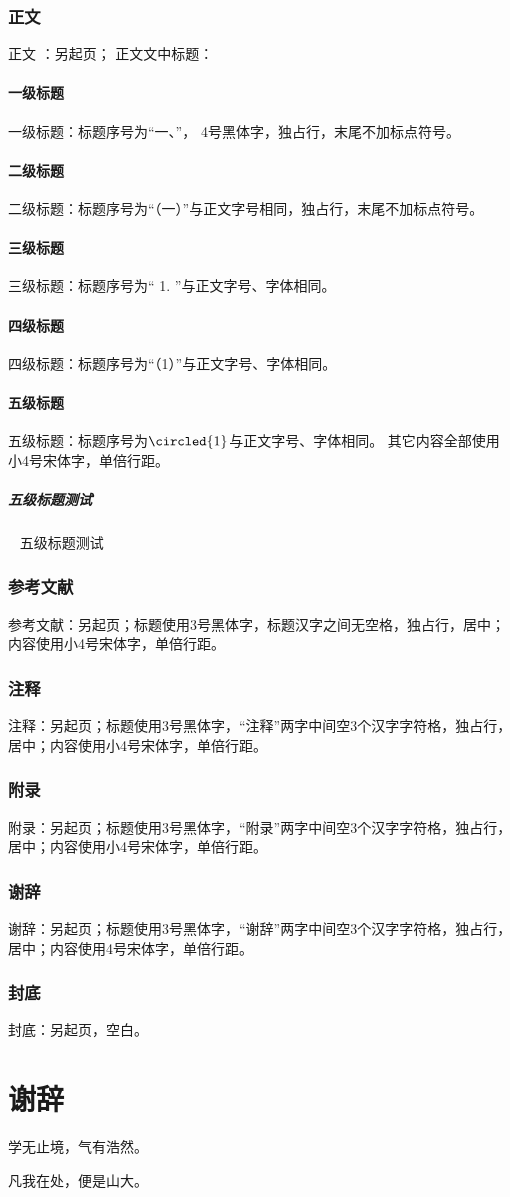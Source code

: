 \documentclass[openany]{sduthesis} %
\begin{document}
\subsection{正文}
正文 ：另起页；
正文文中标题：
\subsubsection{一级标题}
    一级标题：标题序号为“一、”， 4号黑体字，独占行，末尾不加标点符号。
\subsubsection{二级标题}
  二级标题：标题序号为“（一）”与正文字号相同，独占行，末尾不加标点符号。
  \subsubsection{三级标题}
 三级标题：标题序号为“ 1. ”与正文字号、字体相同。
 \subsubsection{四级标题}
    四级标题：标题序号为“（1）”与正文字号、字体相同。
 \subsubsection{五级标题}
五级标题：标题序号为$\circled{1}$与正文字号、字体相同。
其它内容全部使用小4号宋体字，单倍行距。
\paragraph{五级标题测试}~{}
\newline
五级标题测试

\subsection{参考文献}
参考文献：另起页；标题使用3号黑体字，标题汉字之间无空格，独占行，居中；内容使用小4号宋体字，单倍行距。
\subsection{注释}
注释：另起页；标题使用3号黑体字，“注释”两字中间空3个汉字字符格，独占行，居中；内容使用小4号宋体字，单倍行距。
\subsection{附录}
附录：另起页；标题使用3号黑体字，“附录”两字中间空3个汉字字符格，独占行，居中；内容使用小4号宋体字，单倍行距。
\subsection{谢辞}
谢辞：另起页；标题使用3号黑体字，“谢辞”两字中间空3个汉字字符格，独占行，居中；内容使用4号宋体字，单倍行距。
\subsection{封底}
封底：另起页，空白。


\clearpage
\chapter*{ 谢{\quad}{\quad}{\quad}辞}
\center

学无止境，气有浩然。

凡我在处，便是山大。
\clearpage
\end{document}
